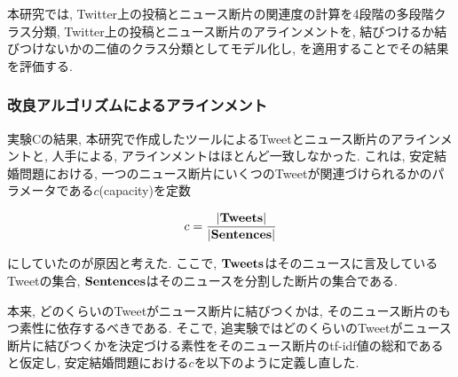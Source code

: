 \documentclass[12pt]{jarticle}
\begin{document}
本研究では, Twitter上の投稿とニュース断片の関連度の計算を4段階の多段階クラス分類, Twitter上の投稿とニュース断片のアラインメントを, 結びつけるか結びつけないかの二値のクラス分類としてモデル化し, \kappac を適用することでその結果を評価する.




\subsubsection{改良アルゴリズムによるアラインメント}
\label{additional_expr}

実験Cの結果, 本研究で作成したツールによるTweetとニュース断片のアラインメントと, 人手による, アラインメントはほとんど一致しなかった. これは, 安定結婚問題における, 一つのニュース断片にいくつのTweetが関連づけられるかのパラメータである$c$(capacity)を定数

\begin{equation}
  c = \frac{ |\bf{Tweets}| }{ |\bf{Sentences}| }
\end{equation}

にしていたのが原因と考えた.
ここで, $\bf{Tweets}$はそのニュースに言及しているTweetの集合, $\bf{Sentences}$はそのニュースを分割した断片の集合である.

本来, どのくらいのTweetがニュース断片に結びつくかは, そのニュース断片のもつ素性に依存するべきである.
そこで, 追実験ではどのくらいのTweetがニュース断片に結びつくかを決定づける素性をそのニュース断片のtf-idf値の総和であると仮定し,
安定結婚問題における$c$を以下のように定義し直した.
\end{document}
